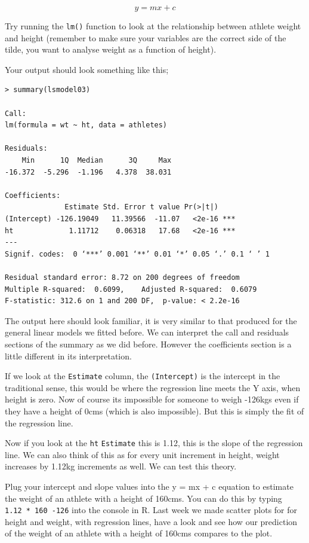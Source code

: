 \documentclass[
]{book}
\begin{document}
\[
y = mx+c
\]

Try running the \texttt{lm()} function to look at the relationship between athlete weight and height (remember to make sure your variables are the correct side of the tilde, you want to analyse weight as a function of height).

Your output should look something like this;

\begin{verbatim}
> summary(lsmodel03)

Call:
lm(formula = wt ~ ht, data = athletes)

Residuals:
    Min      1Q  Median      3Q     Max 
-16.372  -5.296  -1.196   4.378  38.031 

Coefficients:
              Estimate Std. Error t value Pr(>|t|)    
(Intercept) -126.19049   11.39566  -11.07   <2e-16 ***
ht             1.11712    0.06318   17.68   <2e-16 ***
---
Signif. codes:  0 ‘***’ 0.001 ‘**’ 0.01 ‘*’ 0.05 ‘.’ 0.1 ‘ ’ 1

Residual standard error: 8.72 on 200 degrees of freedom
Multiple R-squared:  0.6099,    Adjusted R-squared:  0.6079 
F-statistic: 312.6 on 1 and 200 DF,  p-value: < 2.2e-16
\end{verbatim}

The output here should look familiar, it is very similar to that produced for the general linear models we fitted before. We can interpret the call and residuals sections of the summary as we did before. However the coefficients section is a little different in its interpretation.

If we look at the \texttt{Estimate} column, the \texttt{(Intercept)} is the intercept in the traditional sense, this would be where the regression line meets the Y axis, when height is zero. Now of course its impossible for someone to weigh -126kgs even if they have a height of 0cms (which is also impossible). But this is simply the fit of the regression line.

Now if you look at the \texttt{ht} \texttt{Estimate} this is 1.12, this is the slope of the regression line. We can also think of this as for every unit increment in height, weight increases by 1.12kg increments as well. We can test this theory.

Plug your intercept and slope values into the y = mx + c equation to estimate the weight of an athlete with a height of 160cms. You can do this by typing \texttt{1.12\ *\ 160\ -126} into the console in R. Last week we made scatter plots for for height and weight, with regression lines, have a look and see how our prediction of the weight of an athlete with a height of 160cms compares to the plot.
\end{document}
